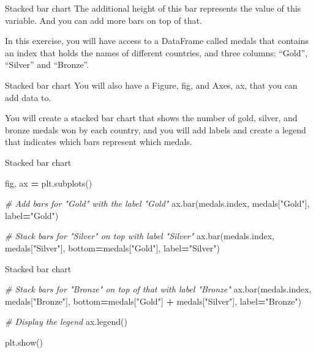 \documentclass[
  ignorenonframetext,
]{beamer}
\newenvironment{Shaded}{\begin{snugshade}}{\end{snugshade}}
\newcommand{\CommentTok}[1]{\textcolor[rgb]{0.56,0.35,0.01}{\textit{#1}}}
\newcommand{\NormalTok}[1]{#1}
\newcommand{\OperatorTok}[1]{\textcolor[rgb]{0.81,0.36,0.00}{\textbf{#1}}}
\newcommand{\StringTok}[1]{\textcolor[rgb]{0.31,0.60,0.02}{#1}}
\begin{document}
\begin{frame}{Stacked bar chart}
\label{stacked-bar-chart-1}
The additional height of this bar represents the value of this variable.
And you can add more bars on top of that.

In this exercise, you will have access to a DataFrame called medals that
contains an index that holds the names of different countries, and three
columns: ``Gold'', ``Silver'' and ``Bronze''.
\end{frame}

\begin{frame}{Stacked bar chart}
\label{stacked-bar-chart-2}
You will also have a Figure, fig, and Axes, ax, that you can add data
to.

You will create a stacked bar chart that shows the number of gold,
silver, and bronze medals won by each country, and you will add labels
and create a legend that indicates which bars represent which medals.
\end{frame}

\begin{frame}[fragile]{Stacked bar chart}
\label{stacked-bar-chart-3}

\begin{Shaded}
\begin{Highlighting}[]
\NormalTok{fig, ax }\OperatorTok{=}\NormalTok{ plt.subplots()}

\CommentTok{\# Add bars for "Gold" with the label "Gold"}
\NormalTok{ax.bar(medals.index, medals[}\StringTok{"Gold"}\NormalTok{], label}\OperatorTok{=}\StringTok{"Gold"}\NormalTok{)}

\CommentTok{\# Stack bars for "Silver" on top with label "Silver"}
\NormalTok{ax.bar(medals.index, medals[}\StringTok{"Silver"}\NormalTok{], bottom}\OperatorTok{=}\NormalTok{medals[}\StringTok{"Gold"}\NormalTok{], label}\OperatorTok{=}\StringTok{"Silver"}\NormalTok{)}
\end{Highlighting}
\end{Shaded}
\end{frame}

\begin{frame}[fragile]{Stacked bar chart}
\label{stacked-bar-chart-4}

\begin{Shaded}
\begin{Highlighting}[]
\CommentTok{\# Stack bars for "Bronze" on top of that with label "Bronze"}
\NormalTok{ax.bar(medals.index, medals[}\StringTok{"Bronze"}\NormalTok{], bottom}\OperatorTok{=}\NormalTok{medals[}\StringTok{"Gold"}\NormalTok{] }\OperatorTok{+}\NormalTok{ medals[}\StringTok{"Silver"}\NormalTok{], label}\OperatorTok{=}\StringTok{"Bronze"}\NormalTok{)}

\CommentTok{\# Display the legend}
\NormalTok{ax.legend()}

\NormalTok{plt.show()}
\end{Highlighting}
\end{Shaded}
\end{frame}
\end{document}
